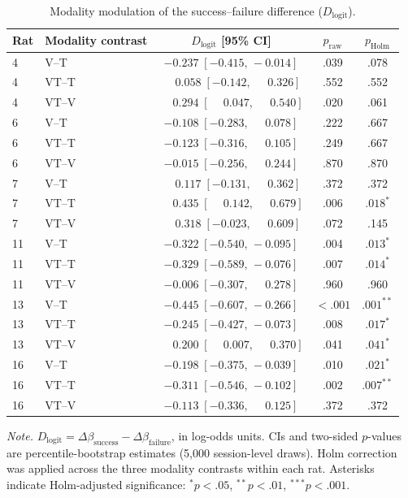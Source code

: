 \begin{table}[htbp]
\centering
\caption{Modality modulation of the success--failure difference ($D_{\mathrm{logit}}$).}
\smallskip
\begin{tabular}{llccc}
\toprule
Rat & Modality contrast & $D_{\mathrm{logit}}$ [95\% CI] & $p_{\mathrm{raw}}$ & $p_{\mathrm{Holm}}$ \\
\midrule
4 & V--T & $-0.237\;[-0.415,\,-0.014]$ & .039 & .078 \\
4 & VT--T & $\phantom{-}0.058\;[-0.142,\,\phantom{-}0.326]$ & .552 & .552 \\
4 & VT--V & $\phantom{-}0.294\;[\phantom{-}0.047,\,\phantom{-}0.540]$ & .020 & .061 \\
6 & V--T & $-0.108\;[-0.283,\,\phantom{-}0.078]$ & .222 & .667 \\
6 & VT--T & $-0.123\;[-0.316,\,\phantom{-}0.105]$ & .249 & .667 \\
6 & VT--V & $-0.015\;[-0.256,\,\phantom{-}0.244]$ & .870 & .870 \\
7 & V--T & $\phantom{-}0.117\;[-0.131,\,\phantom{-}0.362]$ & .372 & .372 \\
7 & VT--T & $\phantom{-}0.435\;[\phantom{-}0.142,\,\phantom{-}0.679]$ & .006 & $.018^{*}$ \\
7 & VT--V & $\phantom{-}0.318\;[-0.023,\,\phantom{-}0.609]$ & .072 & .145 \\
11 & V--T & $-0.322\;[-0.540,\,-0.095]$ & .004 & $.013^{*}$ \\
11 & VT--T & $-0.329\;[-0.589,\,-0.076]$ & .007 & $.014^{*}$ \\
11 & VT--V & $-0.006\;[-0.307,\,\phantom{-}0.278]$ & .960 & .960 \\
13 & V--T & $-0.445\;[-0.607,\,-0.266]$ & $<.001$ & $.001^{**}$ \\
13 & VT--T & $-0.245\;[-0.427,\,-0.073]$ & .008 & $.017^{*}$ \\
13 & VT--V & $\phantom{-}0.200\;[\phantom{-}0.007,\,\phantom{-}0.370]$ & .041 & $.041^{*}$ \\
16 & V--T & $-0.198\;[-0.375,\,-0.039]$ & .010 & $.021^{*}$ \\
16 & VT--T & $-0.311\;[-0.546,\,-0.102]$ & .002 & $.007^{**}$ \\
16 & VT--V & $-0.113\;[-0.336,\,\phantom{-}0.125]$ & .372 & .372 \\
\bottomrule
\end{tabular}
\vspace{5pt}
\footnotesize\raggedright \textit{Note.} $D_{\mathrm{logit}}=\Delta\beta_{\mathrm{success}}-\Delta\beta_{\mathrm{failure}}$, in log-odds units. CIs and two-sided $p$-values are percentile-bootstrap estimates (5,000 session-level draws). Holm correction was applied across the three modality contrasts within each rat. Asterisks indicate Holm-adjusted significance: $^{*}p<.05$, $^{**}p<.01$, $^{***}p<.001$.
\end{table}
